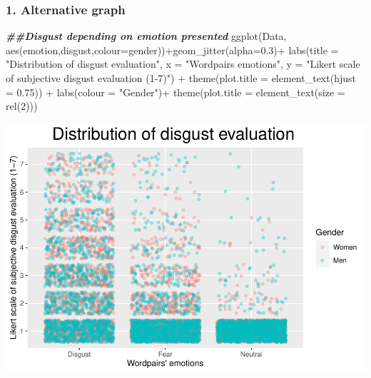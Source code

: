 \documentclass[
]{article}
\newenvironment{Shaded}{\begin{snugshade}}{\end{snugshade}}
\newcommand{\AttributeTok}[1]{\textcolor[rgb]{0.77,0.63,0.00}{#1}}
\newcommand{\DecValTok}[1]{\textcolor[rgb]{0.00,0.00,0.81}{#1}}
\newcommand{\DocumentationTok}[1]{\textcolor[rgb]{0.56,0.35,0.01}{\textbf{\textit{#1}}}}
\newcommand{\FloatTok}[1]{\textcolor[rgb]{0.00,0.00,0.81}{#1}}
\newcommand{\FunctionTok}[1]{\textcolor[rgb]{0.00,0.00,0.00}{#1}}
\newcommand{\NormalTok}[1]{#1}
\newcommand{\SpecialCharTok}[1]{\textcolor[rgb]{0.00,0.00,0.00}{#1}}
\newcommand{\StringTok}[1]{\textcolor[rgb]{0.31,0.60,0.02}{#1}}
\begin{document}
\hypertarget{alternative-graph}{%
\subsubsection{1. Alternative graph}\label{alternative-graph}}

\begin{Shaded}
\begin{Highlighting}[]
\DocumentationTok{\#\#Disgust depending on emotion presented}
\FunctionTok{ggplot}\NormalTok{(Data, }\FunctionTok{aes}\NormalTok{(emotion,disgust,}\AttributeTok{colour=}\NormalTok{gender))}\SpecialCharTok{+}\FunctionTok{geom\_jitter}\NormalTok{(}\AttributeTok{alpha=}\FloatTok{0.3}\NormalTok{)}\SpecialCharTok{+}
  \FunctionTok{labs}\NormalTok{(}\AttributeTok{title =} \StringTok{"Distribution of disgust evaluation"}\NormalTok{, }\AttributeTok{x =} \StringTok{"Wordpairs\textquotesingle{} emotions"}\NormalTok{, }\AttributeTok{y =} \StringTok{"Likert scale of subjective disgust evaluation (1{-}7)"}\NormalTok{) }\SpecialCharTok{+} \FunctionTok{theme}\NormalTok{(}\AttributeTok{plot.title =} \FunctionTok{element\_text}\NormalTok{(}\AttributeTok{hjust =} \FloatTok{0.75}\NormalTok{)) }\SpecialCharTok{+} \FunctionTok{labs}\NormalTok{(}\AttributeTok{colour =} \StringTok{"Gender"}\NormalTok{)}\SpecialCharTok{+} \FunctionTok{theme}\NormalTok{(}\AttributeTok{plot.title =} \FunctionTok{element\_text}\NormalTok{(}\AttributeTok{size =} \FunctionTok{rel}\NormalTok{(}\DecValTok{2}\NormalTok{)))}
\end{Highlighting}
\end{Shaded}

\includegraphics{DAP_v4-1-22_files/figure-latex/alternate graph-1.pdf}
\end{document}
